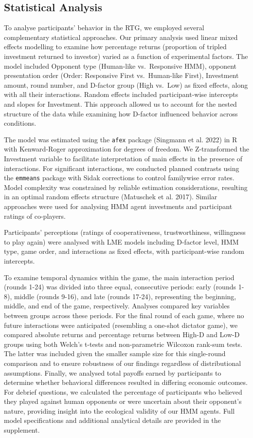 \documentclass[
]{article}
\begin{document}
\subsection{Statistical Analysis}\label{statistical-analysis}

To analyse participants' behavior in the RTG, we employed several complementary statistical approaches. Our primary analysis used linear mixed effects modelling to examine how percentage returns (proportion of tripled investment returned to investor) varied as a function of experimental factors. The model included Opponent type (Human-like vs.~Responsive HMM), opponent presentation order (Order: Responsive First vs.~Human-like First), Investment amount, round number, and D-factor group (High vs.~Low) as fixed effects, along with all their interactions. Random effects included participant-wise intercepts and slopes for Investment. This approach allowed us to account for the nested structure of the data while examining how D-factor influenced behavior across conditions.

The model was estimated using the \texttt{afex} package (Singmann et al. 2022) in R with Kenward-Roger approximation for degrees of freedom. We Z-transformed the Investment variable to facilitate interpretation of main effects in the presence of interactions. For significant interactions, we conducted planned contrasts using the \texttt{emmeans} package with Sidak corrections to control familywise error rates. Model complexity was constrained by reliable estimation considerations, resulting in an optimal random effects structure (Matuschek et al. 2017). Similar approaches were used for analysing HMM agent investments and participant ratings of co-players.

Participants' perceptions (ratings of cooperativeness, trustworthiness, willingness to play again) were analysed with LME models including D-factor level, HMM type, game order, and interactions as fixed effects, with participant-wise random intercepts.

To examine temporal dynamics within the game, the main interaction period (rounds 1-24) was divided into three equal, consecutive periods: early (rounds 1-8), middle (rounds 9-16), and late (rounds 17-24), representing the beginning, middle, and end of the game, respectively. Analyses compared key variables between groups across these periods. For the final round of each game, where no future interactions were anticipated (resembling a one-shot dictator game), we compared absolute returns and percentage returns between High-D and Low-D groups using both Welch's t-tests and non-parametric Wilcoxon rank-sum tests. The latter was included given the smaller sample size for this single-round comparison and to ensure robustness of our findings regardless of distributional assumptions. Finally, we analysed total payoffs earned by participants to determine whether behavioral differences resulted in differing economic outcomes. For debrief questions, we calculated the percentage of participants who believed they played against human opponents or were uncertain about their opponent's nature, providing insight into the ecological validity of our HMM agents. Full model specifications and additional analytical details are provided in the supplement.
\end{document}
